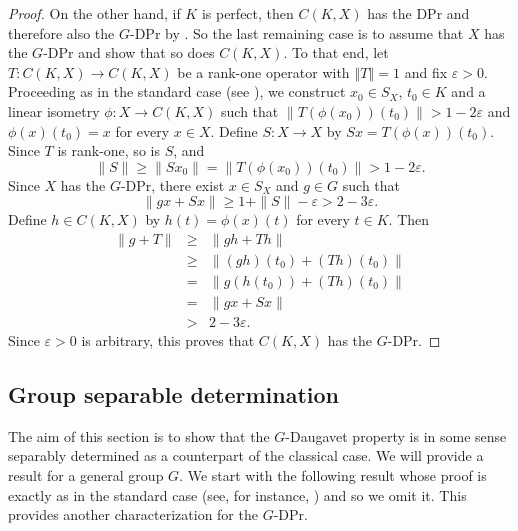 \documentclass[a4paper,12pt]{amsart}
\theoremstyle{definition}
\theoremstyle{definition}
\theoremstyle{remark}
\numberwithin{equation}{section}
\renewcommand{\geq}{\geqslant}
\newcommand{\<}{\langle}
\renewcommand{\>}{\rangle}
\newcommand{\norm}[1]{\left\Vert#1\right\Vert}
\newcommand{\e}{\varepsilon}
\newcommand{\eps}{\e}
\begin{document}
\begin{proof}
		On the other hand, if $K$ is perfect, then $C(K,X)$ has the DPr and therefore also the $G$-DPr by . So the last remaining case is to assume that $X$ has the $G$-DPr and show that so does $C(K,X)$. To that end, let $T:C(K,X)\rightarrow C(K,X)$ be a rank-one operator with $\norm{T}=1$ and fix $\eps>0$. Proceeding as in the standard case (see \cite[Theorem 5]{MartinPaya2000}), we construct $x_0\in S_X$, $t_0\in K$ and a linear isometry $\phi:X\to C(K,X)$ such that $\|T(\phi(x_0))(t_0)\|>1-2\eps$
		and $\phi(x)(t_0)=x$ for every $x\in X$. Define $S:X\rightarrow X$ by $Sx=T(\phi(x))(t_0)$. Since $T$ is rank-one, so is $S$, and
		\begin{equation*}
			\|S\| \geq \|Sx_0\| = \|T(\phi(x_0))(t_0)\| > 1 -2\e.
		\end{equation*}
		Since $X$ has the $G$-DPr, there exist $x\in S_X$ and $g\in G$ such that
		\begin{equation*}
			\|gx+Sx\| \geq 1+ \|S\|-\eps > 2-3\eps.
		\end{equation*}
		Define $h\in C(K,X)$ by $h(t)=\phi(x)(t)$ for every $t\in K$. Then
		\begin{eqnarray*}
			\|g+T\|
			&\geq& \|gh+Th\| \\
			&\geq& \|(gh)(t_0)+(Th)(t_0)\|\\
			&=& \|g(h(t_0))+(Th)(t_0)\|\\
			&=& \|gx+Sx\|\\
			&>& 2-3\eps.
		\end{eqnarray*}
		Since $\eps>0$ is arbitrary, this proves that $C(K,X)$ has the $G$-DPr.
	\end{proof}
	
	
	
	
	
	
	
	
	
	
	
	
	
	
	
	
	
	
	\subsection{Group separable determination}
	
	The aim of this section is to show that the $G$-Daugavet property is in some sense separably determined as a counterpart of the classical case. We will provide a result for a general group $G$. We start with the following result whose proof is exactly as in the standard case (see, for instance, \cite[Proposition 4.1.2]{KMRW}) and so we omit it. This provides another characterization for the $G$-DPr.
	
\end{document}
